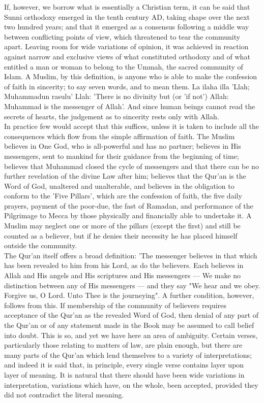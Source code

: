 \documentclass[11pt, b5paper, twoside]{book}
\begin{document}
If, however, we borrow what is essentially a Christian term, it can be said that Sunni orthodoxy emerged in the tenth century AD, taking shape over the next two hundred years; and that it emerged as a consensus following a middle way between conflicting points of view, which threatened to tear the community apart. Leaving room for wide variations of opinion, it was achieved in reaction against narrow and exclusive views of what constituted orthodoxy and of what entitled a man or woman to belong to the Ummah, the sacred community of Islam. A Muslim, by this definition, is anyone who is able to make the confession of faith in sincerity; to say seven words, and to mean them. La ilaha illa 'Llah; Muhammadun rasulu' Llah: 'There is no divinity but (or 'if not') Allah: Muhammad is the messenger of Allah'. And since human beings cannot read the secrets of hearts, the judgement as to sincerity rests only with Allah. \\

In practice few would accept that this suffices, unless it is taken to include all the consequences which flow from the simple affirmation of faith. The Muslim believes in One God, who is all-powerful and has no partner; believes in His messengers, sent to mankind for their guidance from the beginning of time; believes that Muhammad closed the cycle of messengers and that there can be no further revelation of the divine Law after him; believes that the Qur'an is the Word of God, unaltered and unalterable, and believes in the obligation to conform to the 'Five Pillars', which are the confession of faith, the five daily prayers, payment of the poor-due, the fast of Ramadan, and performance of the Pilgrimage to Mecca by those physically and financially able to undertake it. A Muslim may neglect one or more of the pillars (except the first) and still be counted as a believer, but if he denies their necessity he has placed himself outside the community. \\

The Qur'an itself offers a broad definition: 'The messenger believes in that which has been revealed to him from his Lord, as do the believers. Each believes in Allah and His angels and His scriptures and His messengers --- We make no distinction between any of His messengers --- and they say "We hear and we obey. Forgive us, O Lord. Unto Thee is the journeying". A further condition, however, follows from this. If membership of the community of believers requires acceptance of the Qur'an as the revealed Word of God, then denial of any part of the Qur'an or of any statement made in the Book may be assumed to call belief into doubt. This is so, and yet we have here an area of ambiguity. Certain verses, particularly those relating to matters of law, are plain enough, but there are many parts of the Qur'an which lend themselves to a variety of interpretations; and indeed it is said that, in principle, every single verse contains layer upon layer of meaning. It is natural that there should have been wide variations in interpretation, variations which have, on the whole, been accepted, provided they did not contradict the literal meaning. \\
\end{document}
